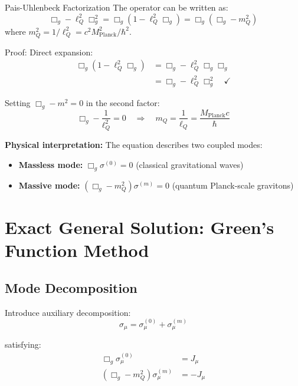 \documentclass[11pt,a4paper]{article}
\theoremstyle{definition}
\theoremstyle{remark}
\begin{document}
		Pais-Uhlenbeck Factorization
			The operator can be written as:
			\begin{equation}
				\Box_g - \ell_Q^2\Box_g^2 = \Box_g\left(1 - \ell_Q^2\Box_g\right) = \Box_g(\Box_g - m_Q^2)
			\end{equation}
			where $m_Q^2 = 1/\ell_Q^2 = c^2M_{\text{Planck}}^2/\hbar^2$.
		
		Proof:
			Direct expansion:
			\begin{align}
				\Box_g(1 - \ell_Q^2\Box_g) &= \Box_g - \ell_Q^2\Box_g\Box_g\\
				&= \Box_g - \ell_Q^2\Box_g^2 \quad \checkmark
			\end{align}
			
			Setting $\Box_g - m^2 = 0$ in the second factor:
			\begin{equation}
				\Box_g - \frac{1}{\ell_Q^2} = 0 \quad \Rightarrow \quad m_Q = \frac{1}{\ell_Q} = \frac{M_{\text{Planck}}c}{\hbar}
			\end{equation}
		
		\textbf{Physical interpretation:} The equation describes two coupled modes:
		\begin{itemize}
			\item \textbf{Massless mode:} $\Box_g\sigma^{(0)} = 0$ (classical gravitational waves)
			\item \textbf{Massive mode:} $(\Box_g - m_Q^2)\sigma^{(m)} = 0$ (quantum Planck-scale gravitons)
		\end{itemize}
		
		\section{Exact General Solution: Green's Function Method}
		
		\subsection{Mode Decomposition}
		
		Introduce auxiliary decomposition:
		\begin{equation}
			\sigma_\mu = \sigma_\mu^{(0)} + \sigma_\mu^{(m)}
		\end{equation}
		
		satisfying:
		\begin{align}
			\Box_g\sigma_\mu^{(0)} &= J_\mu\\
			(\Box_g - m_Q^2)\sigma_\mu^{(m)} &= -J_\mu
		\end{align}
		
\end{document}
